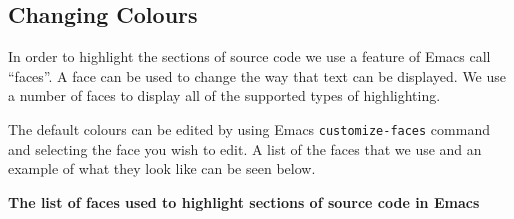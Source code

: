 \documentclass{report}
\begin{document}
\newpage


\subsection{Changing Colours}

In order to highlight the sections of source code we use a feature of
Emacs call ``faces''. A face can be used to change the way that text
can be displayed. We use a number of faces to display all of the
supported types of highlighting.

The default colours can be edited by using Emacs
\texttt{customize-faces} command and selecting the face you wish to
edit. A list of the faces that we use and an example of what they look
like can be seen below.

\medskip

\textbf{The list of faces used to highlight sections of source code in
  Emacs}
\end{document}
